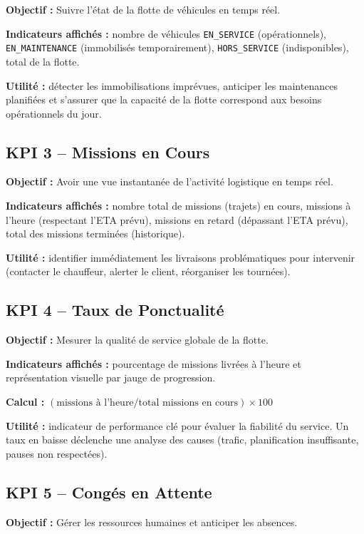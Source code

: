 \documentclass[12pt,a4paper]{report}
\begin{document}
\textbf{Objectif :} Suivre l'état de la flotte de véhicules en temps réel.

\textbf{Indicateurs affichés :} nombre de véhicules \texttt{EN\_SERVICE}
(opérationnels), \texttt{EN\_MAINTENANCE} (immobilisés temporairement),
\texttt{HORS\_SERVICE} (indisponibles), total de la flotte.

\textbf{Utilité :} détecter les immobilisations imprévues, anticiper les
maintenances planifiées et s'assurer que la capacité de la flotte
correspond aux besoins opérationnels du jour.

\subsection{KPI 3 -- Missions en Cours}

\textbf{Objectif :} Avoir une vue instantanée de l'activité logistique en
temps réel.

\textbf{Indicateurs affichés :} nombre total de missions (trajets) en
cours, missions à l'heure (respectant l'ETA prévu), missions en retard
(dépassant l'ETA prévu), total des missions terminées (historique).

\textbf{Utilité :} identifier immédiatement les livraisons problématiques
pour intervenir (contacter le chauffeur, alerter le client, réorganiser
les tournées).

\subsection{KPI 4 -- Taux de Ponctualité}

\textbf{Objectif :} Mesurer la qualité de service globale de la flotte.

\textbf{Indicateurs affichés :} pourcentage de missions livrées à l'heure
et représentation visuelle par jauge de progression.

\textbf{Calcul :} $( \text{missions à l'heure} / \text{total missions en cours} ) \times 100$

\textbf{Utilité :} indicateur de performance clé pour évaluer la fiabilité
du service. Un taux en baisse déclenche une analyse des causes (trafic,
planification insuffisante, pauses non respectées).

\subsection{KPI 5 -- Congés en Attente}

\textbf{Objectif :} Gérer les ressources humaines et anticiper les absences.
\end{document}

